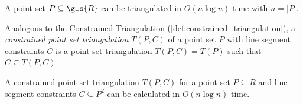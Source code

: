
\begin{theorem}
  A point set \(P \subseteq \gls{R}\) can be triangulated
  in \(O(n \log n)\) time with \(n = |P|\).
  \cite[Theorem 9.12]{deberg_compgeom}
\end{theorem}


\begin{definition}
  \label{def:constrained_point_set_triangulation}
  Analogous to the Constrained Triangulation
  (\cref{def:constrained_triangulation}), a 
  \emph{constrained point set triangulation} \(T(P,C)\) of a point
  set \(P\) with line segment constraints \(C\) is a point set
  triangulation \(T(P,C) = T(P)\) such that \(C \subseteq T(P, C)\).
\end{definition}


\begin{theorem}
  A constrained point set triangulation \(T(P, C)\) for a point set
  \(P \subseteq R\) and line segment constraints \(C \subseteq P^2\)
  can be calculated in \(O(n \log n)\) time.
  \cite{constrained_triangulation}
\end{theorem}

